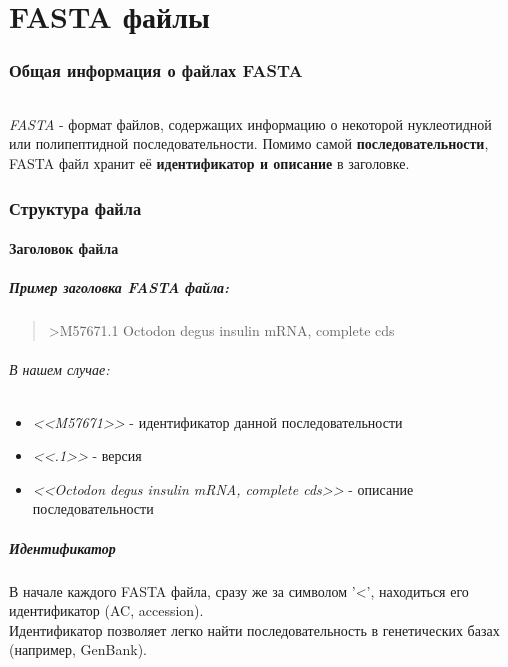 \documentclass{article}
\begin{document}
    \part{FASTA файлы}
        \section{Общая информация о файлах FASTA}
            \paragraph{}
                    \emph{FASTA} - формат файлов, содержащих информацию о некоторой нуклеотидной или полипептидной последовательности.
                    Помимо самой \textbf{последовательности}, FASTA файл хранит её \textbf{идентификатор и описание} в заголовке.
        \section {Структура файла}
            \subsection{Заголовок файла}
                \subsubsection{Пример заголовка FASTA файла:}
                    \begin{quote}
                        >M57671.1 Octodon degus insulin mRNA, complete cds
                    \end{quote}
                    \paragraph{В нашем случае:}
                        \begin{itemize}
                          \item \emph{<<M57671>>} - идентификатор данной последовательности
                          \item \emph{<<.1>>} - версия
                          \item \emph{<<Octodon degus insulin mRNA, complete cds>>} - описание последовательности
                        \end{itemize}
                \subsubsection{Идентификатор}
                    В начале каждого FASTA файла, сразу же за символом '<', находиться его идентификатор (AC, accession).\\
                    Идентификатор позволяет легко найти последовательность в генетических базах (например, GenBank).
\end{document}
